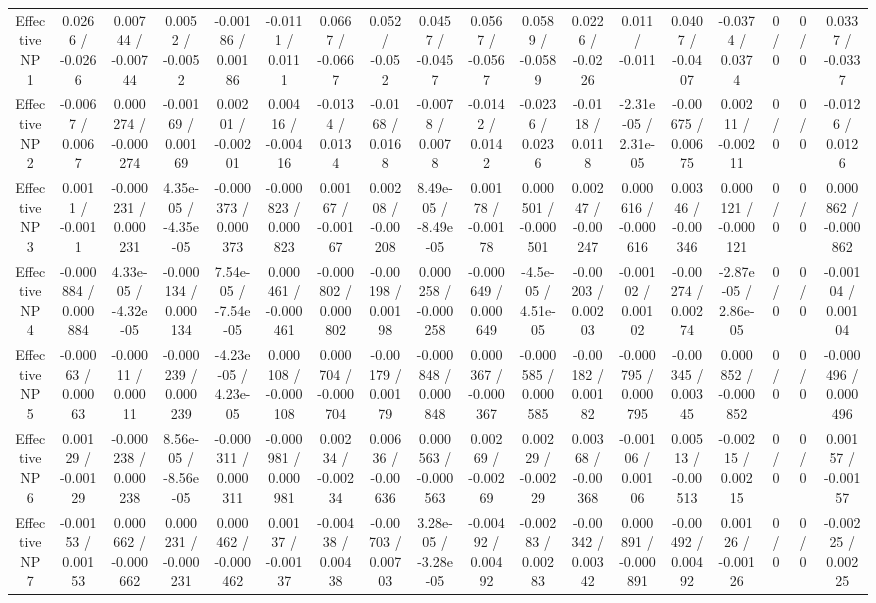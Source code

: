 \documentclass[10pt]{article}
\begin{document}
\begin{table}[htbp]
\begin{center}
\begin{tabular}{|c|c|c|c|c|c|c|c|c|c|c|c|c|c|c|c|c|c|}
  Effective NP 1 & 0.0266 / -0.0266 & 0.00744 / -0.00744 & 0.0052 / -0.0052 & -0.00186 / 0.00186 & -0.0111 / 0.0111 & 0.0667 / -0.0667 & 0.052 / -0.052 & 0.0457 / -0.0457 & 0.0567 / -0.0567 & 0.0589 / -0.0589 & 0.0226 / -0.0226 & 0.011 / -0.011 & 0.0407 / -0.0407 & -0.0374 / 0.0374 & 0 / 0 & 0 / 0 & 0.0337 / -0.0337 \\ 
  Effective NP 2 & -0.0067 / 0.0067 & 0.000274 / -0.000274 & -0.00169 / 0.00169 & 0.00201 / -0.00201 & 0.00416 / -0.00416 & -0.0134 / 0.0134 & -0.0168 / 0.0168 & -0.0078 / 0.0078 & -0.0142 / 0.0142 & -0.0236 / 0.0236 & -0.0118 / 0.0118 & -2.31e-05 / 2.31e-05 & -0.00675 / 0.00675 & 0.00211 / -0.00211 & 0 / 0 & 0 / 0 & -0.0126 / 0.0126 \\ 
  Effective NP 3 & 0.0011 / -0.0011 & -0.000231 / 0.000231 & 4.35e-05 / -4.35e-05 & -0.000373 / 0.000373 & -0.000823 / 0.000823 & 0.00167 / -0.00167 & 0.00208 / -0.00208 & 8.49e-05 / -8.49e-05 & 0.00178 / -0.00178 & 0.000501 / -0.000501 & 0.00247 / -0.00247 & 0.000616 / -0.000616 & 0.00346 / -0.00346 & 0.000121 / -0.000121 & 0 / 0 & 0 / 0 & 0.000862 / -0.000862 \\ 
  Effective NP 4 & -0.000884 / 0.000884 & 4.33e-05 / -4.32e-05 & -0.000134 / 0.000134 & 7.54e-05 / -7.54e-05 & 0.000461 / -0.000461 & -0.000802 / 0.000802 & -0.00198 / 0.00198 & 0.000258 / -0.000258 & -0.000649 / 0.000649 & -4.5e-05 / 4.51e-05 & -0.00203 / 0.00203 & -0.00102 / 0.00102 & -0.00274 / 0.00274 & -2.87e-05 / 2.86e-05 & 0 / 0 & 0 / 0 & -0.00104 / 0.00104 \\ 
  Effective NP 5 & -0.00063 / 0.00063 & -0.00011 / 0.00011 & -0.000239 / 0.000239 & -4.23e-05 / 4.23e-05 & 0.000108 / -0.000108 & 0.000704 / -0.000704 & -0.00179 / 0.00179 & -0.000848 / 0.000848 & 0.000367 / -0.000367 & -0.000585 / 0.000585 & -0.00182 / 0.00182 & -0.000795 / 0.000795 & -0.00345 / 0.00345 & 0.000852 / -0.000852 & 0 / 0 & 0 / 0 & -0.000496 / 0.000496 \\ 
  Effective NP 6 & 0.00129 / -0.00129 & -0.000238 / 0.000238 & 8.56e-05 / -8.56e-05 & -0.000311 / 0.000311 & -0.000981 / 0.000981 & 0.00234 / -0.00234 & 0.00636 / -0.00636 & 0.000563 / -0.000563 & 0.00269 / -0.00269 & 0.00229 / -0.00229 & 0.00368 / -0.00368 & -0.00106 / 0.00106 & 0.00513 / -0.00513 & -0.00215 / 0.00215 & 0 / 0 & 0 / 0 & 0.00157 / -0.00157 \\ 
  Effective NP 7 & -0.00153 / 0.00153 & 0.000662 / -0.000662 & 0.000231 / -0.000231 & 0.000462 / -0.000462 & 0.00137 / -0.00137 & -0.00438 / 0.00438 & -0.00703 / 0.00703 & 3.28e-05 / -3.28e-05 & -0.00492 / 0.00492 & -0.00283 / 0.00283 & -0.00342 / 0.00342 & 0.000891 / -0.000891 & -0.00492 / 0.00492 & 0.00126 / -0.00126 & 0 / 0 & 0 / 0 & -0.00225 / 0.00225 \\ 

\end{tabular}
\end{center}
\end{table}
\end{document}
